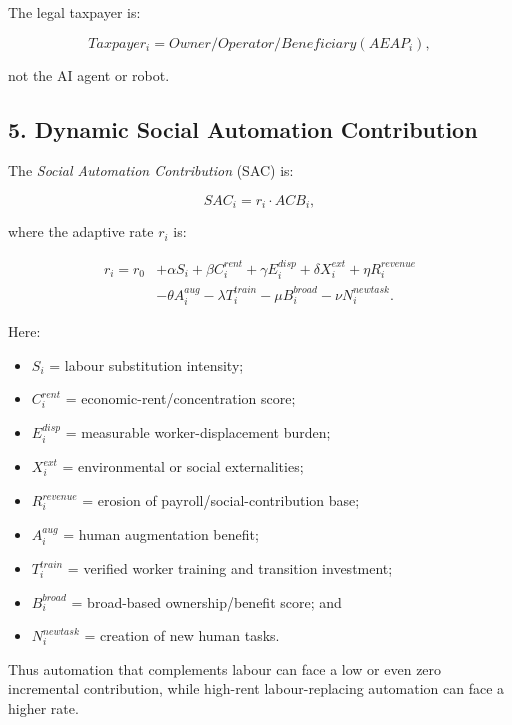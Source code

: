\documentclass[conference]{IEEEtran}
\begin{document}
The legal taxpayer is:

\begin{equation}
Taxpayer_i = Owner/Operator/Beneficiary(AEAP_i),
\end{equation}

not the AI agent or robot.

\subsection{5. Dynamic Social Automation Contribution}

The \textit{Social Automation Contribution} (SAC) is:

\begin{equation}
SAC_i = r_i \cdot ACB_i,
\end{equation}

where the adaptive rate $r_i$ is:

\begin{align}
r_i = r_0
&+\alpha S_i
+\beta C_i^{rent}
+\gamma E_i^{disp}
+\delta X_i^{ext}
+\eta R_i^{revenue} \nonumber\\
&-\theta A_i^{aug}
-\lambda T_i^{train}
-\mu B_i^{broad}
-\nu N_i^{newtask}.
\end{align}

Here:

\begin{itemize}
\item $S_i$ = labour substitution intensity;
\item $C_i^{rent}$ = economic-rent/concentration score;
\item $E_i^{disp}$ = measurable worker-displacement burden;
\item $X_i^{ext}$ = environmental or social externalities;
\item $R_i^{revenue}$ = erosion of payroll/social-contribution base;
\item $A_i^{aug}$ = human augmentation benefit;
\item $T_i^{train}$ = verified worker training and transition investment;
\item $B_i^{broad}$ = broad-based ownership/benefit score; and
\item $N_i^{newtask}$ = creation of new human tasks.
\end{itemize}

Thus automation that complements labour can face a low or even zero incremental
contribution, while high-rent labour-replacing automation can face a higher
rate.
\end{document}
